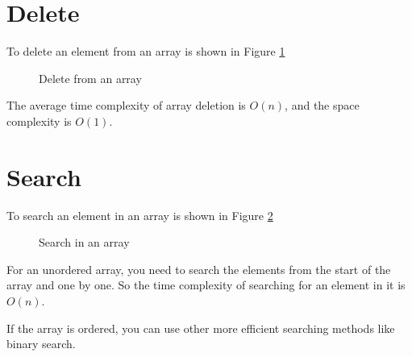 \section{Delete}

To delete an element from an array is shown in Figure \ref{fig:array-delete}
\begin{figure}[!htp]
  \centering

  \caption{Delete from an array}
  \label{fig:array-delete}
\end{figure}

The average time complexity of array deletion is $O(n)$, and the space complexity is $O(1)$.


\section{Search}

To search an element in an array is shown in Figure \ref{fig:array-search}
\begin{figure}[!htp]
  \centering

  \caption{Search in an array}
  \label{fig:array-search}
\end{figure}


For an unordered array, you need to search the elements from the start of the array and one by one. So the time complexity of searching for an element in it is $O(n)$.

If the array is ordered, you can use other more efficient searching methods like binary search. 



